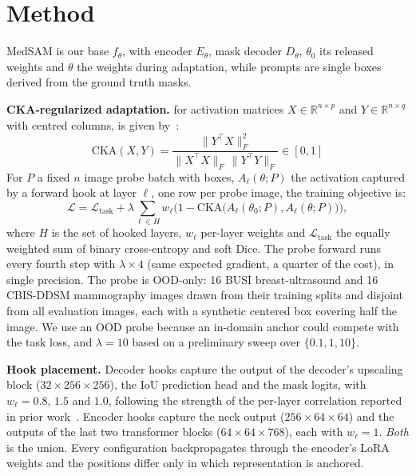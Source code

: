 \documentclass[runningheads]{llncs}
\begin{document}
\section{Method}
\label{sec:method}

MedSAM is our base $f_\theta$, with encoder $E_\theta$, mask decoder $D_\theta$, $\theta_0$ its released weights and $\theta$ the weights during adaptation, while prompts are single boxes derived from the ground truth masks.

\textbf{CKA-regularized adaptation.} for activation matrices $X \in \mathbb{R}^{n \times p}$ and $Y \in \mathbb{R}^{n \times q}$ with centred columns, is given by~\cite{kornblith2019cka}:
\begin{equation}
  \mathrm{CKA}(X, Y) = \frac{\lVert Y^\top X \rVert_F^2}{\lVert X^\top X \rVert_F \,\lVert Y^\top Y \rVert_F} \in [0,1]
\end{equation}
For $P$ a fixed $n$ image probe batch with boxes, $A_\ell(\theta; P)$ the activation captured by a forward hook at layer $\ell$, one row per probe image, the training objective is:
\begin{equation}
  \mathcal{L} = \mathcal{L}_{\text{task}} + \lambda \sum_{\ell \in H} w_\ell \bigl(1 - \mathrm{CKA}\bigl(A_\ell(\theta_0; P), A_\ell(\theta; P)\bigr)\bigr),
  \label{eq:loss}
\end{equation}
where $H$ is the set of hooked layers, $w_\ell$ per-layer weights and $\mathcal{L}_{\text{task}}$ the equally weighted sum of binary cross-entropy and soft Dice. The probe forward runs every fourth step with $\lambda \times 4$ (same expected gradient, a quarter of the cost), in single precision. The probe is OOD-only: 16 BUSI breast-ultrasound and 16 CBIS-DDSM mammography images drawn from their training splits and disjoint from all evaluation images, each with a synthetic centered box covering half the image. We use an OOD probe because an in-domain anchor could compete with the task loss, and $\lambda = 10$ based on a preliminary sweep over $\{0.1, 1, 10\}$.

\textbf{Hook placement.} Decoder hooks capture the output of the decoder's upscaling block ($32 \times 256 \times 256$), the IoU prediction head and the mask logits, with $w_\ell = 0.8$, $1.5$ and $1.0$, following the strength of the per-layer correlation reported in prior work~\cite{prior2026safer}. Encoder hooks capture the neck output ($256 \times 64 \times 64$) and the outputs of the last two transformer blocks ($64 \times 64 \times 768$), each with $w_\ell = 1$. \emph{Both} is the union. Every configuration backpropagates through the encoder's LoRA weights and the positions differ only in which representation is anchored.
\end{document}
